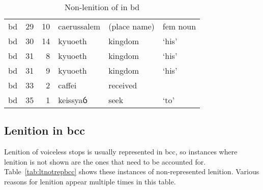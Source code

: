 \begin{table}[h]
  \centering
  \begin{tabular}{addwql}
    \toprule
     &  &  &  &  &  \\
    \midrule
    bd & 29 & 10 & caerussalem & (place name) & fem noun \\
    bd & 30 & 14 & kyuoeth & kingdom &  ‘his' \\
    bd & 31 & 8 & kyuoeth & kingdom &  ‘his' \\
    bd & 31 & 9 & kyuoeth & kingdom &  ‘his' \\
    bd & 33 & 2 & caffei & received &  \\
    bd & 35 & 1 & keissyaỽ & seek &  ‘to' \\
    \bottomrule
  \end{tabular}%
  \caption{Non-lenition of  in \acrshort{bd}}
  \label{tab:nonlencbd}
\end{table}

\subsection{Lenition in \acrshort{bcc}}
\label{sec:lenition-acrshortbcc}


Lenition of voiceless stops is usually represented in \gls{bcc}, so instances where lenition is not shown are the ones that need to be accounted for.
Table~\ref{tab:ltnotrepbcc} shows these instances of non-represented lenition.
Various reasons for lenition appear multiple times in this table.



